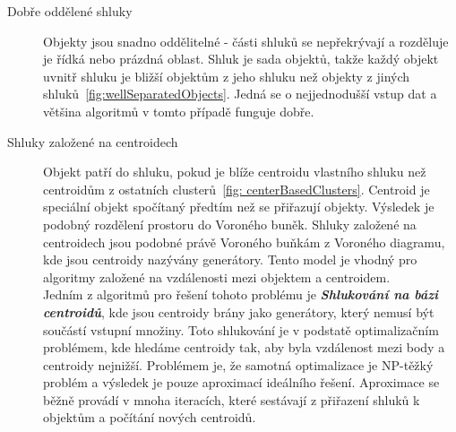 \begin{description}
\item[Dobře oddělené shluky] Objekty jsou snadno oddělitelné - části shluků se nepřekrývají a rozděluje je řídká nebo prázdná oblast. Shluk je sada objektů, takže každý objekt uvnitř shluku je bližší objektům z jeho shluku než objekty z jiných shluků~\autoref{fig:wellSeparatedObjects}. Jedná se o nejjednodušší vstup dat a většina algoritmů v tomto případě funguje dobře.

\item[Shluky založené na centroidech] Objekt patří do shluku, pokud je blíže centroidu vlastního shluku než centroidům z ostatních clusterů~\autoref{fig: centerBasedClusters}. Centroid je speciální objekt spočítaný předtím než se přiřazují objekty. Výsledek je podobný rozdělení prostoru do Voroného buněk. Shluky založené na centroidech jsou podobné právě Voroného buňkám z Voroného diagramu, kde jsou centroidy nazývány generátory. Tento model je vhodný pro algoritmy založené na vzdálenosti mezi objektem a centroidem.\\
Jedním z algoritmů pro řešení tohoto problému je \textit{\textbf {Shlukování na bázi centroidů}}, kde jsou centroidy brány jako generátory, který nemusí být součástí vstupní množiny. Toto shlukování je v podstatě optimalizačním problémem, kde hledáme centroidy tak, aby byla vzdálenost mezi body a centroidy nejnižší. Problémem je, že samotná optimalizace je NP-těžký problém a výsledek je pouze aproximací ideálního řešení. Aproximace se běžně provádí v mnoha iteracích, které sestávají z přiřazení shluků k objektům a počítání nových centroidů.


\end{description}
